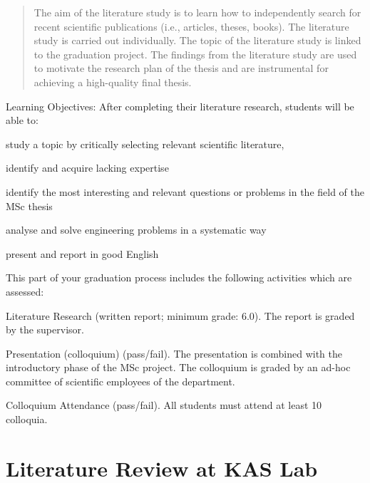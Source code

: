 \begin{quote}
The aim of the literature study is to learn how to independently search for recent scientific publications (i.e., articles, theses, books). The literature study is carried out individually. The topic of the literature study is linked to the graduation project. The findings from the literature study are used to motivate the research plan of the thesis and are instrumental for achieving a high-quality final thesis.
\end{quote}

Learning Objectives:
After completing their literature research, students will be able to:
\begin{list}
    \item study a topic by critically selecting relevant scientific literature,
    \item identify and acquire lacking expertise
    \item identify the most interesting and relevant questions or problems in the field of the MSc thesis
    \item analyse and solve engineering problems in a systematic way
    \item present and report in good English
\end{list}

This part of your graduation process includes the following activities which are assessed:
\begin{list}
    \item Literature Research (written report; minimum grade: 6.0). The report is graded by the supervisor.
    \item Presentation (colloquium) (pass/fail). The presentation is combined with the introductory phase of the MSc project. The colloquium is graded by an ad-hoc committee of scientific employees of the department.
    \item Colloquium Attendance (pass/fail). All students must attend at least 10 colloquia.
\end{list}
	
\section{Literature Review at KAS Lab}
